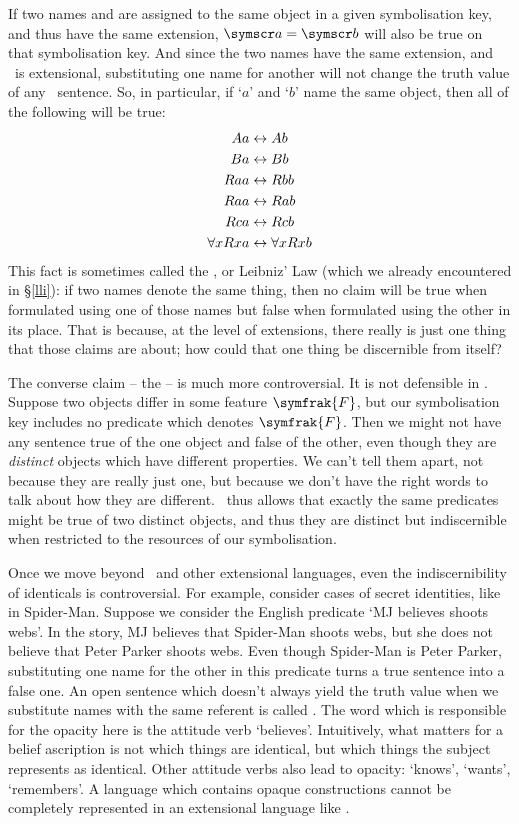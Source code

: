 If two names  and  are assigned to the same object in a given symbolisation key, and thus have the same extension, $\meta{a}=\meta{b}$ will also be true  on that symbolisation key. And since the two names have the same extension, and \FOL\ is extensional, substituting one name for another will not change the truth value of any \FOL\ sentence. So, in particular, if `$a$' and `$b$' name the same object, then all of the following will be true:\label{model.nonidentity}
	\begin{align*}
	 	Aa &\leftrightarrow Ab \\
	 	Ba &\leftrightarrow Bb\\
		Raa &\leftrightarrow Rbb\\
		Raa & \leftrightarrow Rab\\
		Rca &\leftrightarrow Rcb\\
		\forall x Rxa &\leftrightarrow \forall x Rxb
	\end{align*}
This fact is sometimes called the , or Leibniz' Law (which we already encountered in §\ref{lli}): if two names denote the same thing, then no claim will be true when formulated using one of those names but false when formulated using the other in its place. That is because, at the level of extensions, there really is just one thing that those claims are about; how could that one thing be discernible from itself?

The converse claim – the  – is much more controversial. It is not defensible in \FOL. Suppose two objects differ in some feature $\symfrak{F}$, but our symbolisation key includes no predicate which denotes $\symfrak{F}$. Then we might not have any sentence true of the one object and false of the other, even though they are \emph{distinct} objects which have different properties. We can't tell them apart, not because they are really just one, but because we don't have the right words to talk about how they are different. \FOL\ thus allows that exactly the same predicates might be true of two distinct objects, and thus they are distinct but indiscernible when restricted to the resources of our symbolisation.

Once we move beyond \FOL\ and other extensional languages, even the indiscernibility of identicals is controversial. For example, consider cases of secret identities, like in Spider-Man. Suppose we consider the English predicate `MJ believes \gap{} shoots webs'. In the story, MJ believes that Spider-Man shoots webs, but she does not believe that Peter Parker shoots webs. Even though Spider-Man is Peter Parker, substituting one name for the other in this predicate turns a true sentence into a false one. An open sentence which doesn't always yield the truth value when we substitute names with the same referent is called . The word which is responsible for the opacity here is the attitude verb `believes'. Intuitively, what matters for a belief ascription is not which things are identical, but which things the subject represents as identical. Other attitude verbs also lead to opacity: `knows', `wants', `remembers'. A language which contains opaque constructions cannot be completely represented in an extensional language like \FOL.  


